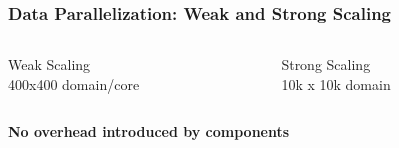 \documentclass{beamer}
\begin{document}
\begin{frame}
\frametitle{Data Parallelization: Weak and Strong Scaling}
\begin{columns}
\begin{column}{6cm}
\begin{center}
\vspace{-1em}
  Weak Scaling\\
  400x400 domain/core
\end{center}
\end{column}
\begin{column}{6cm}
\begin{center}
\vspace{-1em}
  Strong Scaling\\
  10k x 10k domain
\end{center}
\end{column}
\end{columns}
\bigskip
\begin{center}
  \textbf{No overhead introduced by components}
\end{center}
\end{frame}
\end{document}
